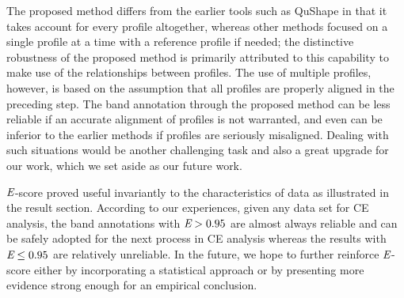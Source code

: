 

The proposed method differs from the earlier tools such as QuShape in that it takes account for every profile altogether, whereas other methods focused on a single profile at a time with a reference profile if needed; the distinctive robustness of the proposed method is primarily attributed to this capability to make use of the relationships between profiles. The use of multiple profiles, however, is based on the assumption that all profiles are properly aligned in the preceding step. The band annotation through the proposed method can be less reliable if an accurate alignment of profiles is not warranted, and even can be inferior to the earlier methods if profiles are seriously misaligned. Dealing with such situations would be another challenging task and also a great upgrade for our work, which we set aside as our future work.

${\emph{E}}$-score proved useful invariantly to the characteristics of data as illustrated in the result section. According to our experiences, given any data set for CE analysis, the band annotations with ${\emph{E}} > 0.95$ are almost always reliable and can be safely adopted for the next process in CE analysis whereas the results with ${\emph{E}} \le 0.95$ are relatively unreliable. In the future, we hope to further reinforce ${\emph{E}}$-score either by incorporating a statistical approach or by presenting more evidence strong enough for an empirical conclusion.

